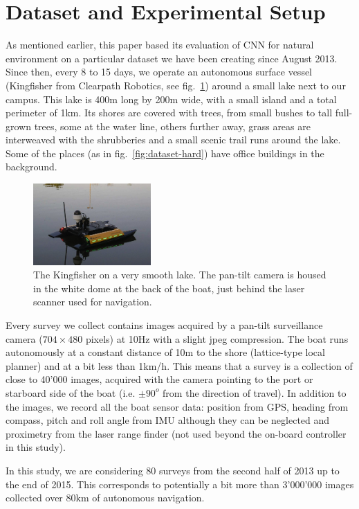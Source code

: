 \section{Dataset and Experimental Setup}
As mentioned earlier, this paper based its evaluation of CNN for natural
environment on a particular dataset we have been creating since August 2013.
Since then, every 8 to 15 days, we operate an autonomous surface vessel
(Kingfisher from Clearpath Robotics, see fig.~\ref{fig:kingfisher}) around a small lake next to our campus.
This lake is 400m long by 200m wide, with a small island and a total perimeter
of 1km. Its shores are covered with trees, from small bushes to tall full-grown
trees, some at the water line, others further away, grass areas are interweaved
with the shrubberies and a small scenic trail runs around the lake. Some of the
places (as in fig.~\ref{fig:dataset-hard}) have office buildings in the
background. 
\begin{figure}[htb]
    \centering
    \includegraphics[width=0.4\textwidth]{images/kingfisher}
    \caption{The Kingfisher on a very smooth lake. The pan-tilt camera is
        housed in the white dome at the back of the boat, just behind the laser
    scanner used for navigation.}
    \label{fig:kingfisher}
\end{figure}

Every survey we collect contains images acquired by a pan-tilt surveillance
camera ($704\times480$ pixels) at 10Hz with a slight jpeg compression. The boat
runs autonomously at a constant distance of 10m to the shore (lattice-type
local planner) and at a bit less than 1km/h. This means that a survey is a
collection of close to 40'000 images, acquired with the camera pointing to the
port or starboard side of the boat (i.e. $\pm90^o$ from the direction of
travel). In addition to the images, we record all the boat sensor data:
position from GPS, heading from compass, pitch and roll angle from IMU although
they can be neglected and proximetry from the laser range finder (not used
beyond the on-board controller in this study). 

In this study, we are considering 80 surveys from the second half of 2013 up to
the end of 2015. This corresponds to potentially a bit more than 3'000'000
images collected over 80km of autonomous navigation. 

